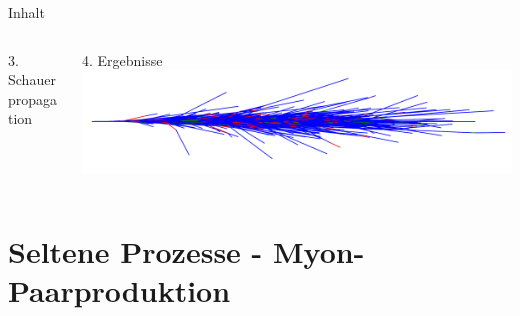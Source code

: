 \documentclass[aspectratio=1610, captions=tableheading, 11pt]{beamer}
\begin{document}
\begin{frame}{Inhalt}
\begin{columns}
\begin{column}{0.4\textwidth}

            \begin{block}{3. Schauerpropagation}
            \end{block}
       \end{column}
       \begin{column}{0.4\textwidth}


           \begin{block}{4. Ergebnisse}
              \centering
                \vspace{2mm}
              \includegraphics[height=0.15\textheight]{plots/shower_nolegend.png}
                \vspace{2mm}
           \end{block}
       \end{column}
   \end{columns}
\end{frame}


\section{Seltene Prozesse - Myon-Paarproduktion}
\end{document}
